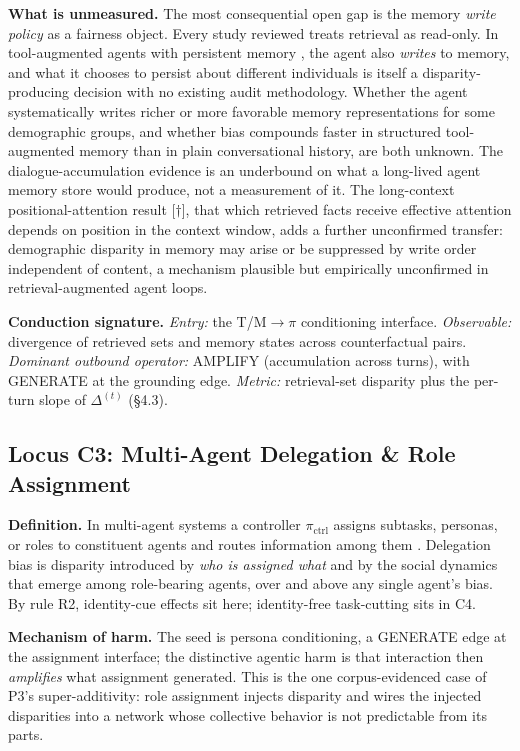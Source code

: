 \documentclass[acmsmall,nonacm]{acmart}
\begin{document}
\textbf{What is unmeasured.} The most consequential open gap is the memory \emph{write policy} as a fairness object. Every study reviewed treats retrieval as read-only. In tool-augmented agents with persistent memory \cite{lewis2020retrieval,packer2023memgpt}, the agent also \emph{writes} to memory, and what it chooses to persist about different individuals is itself a disparity-producing decision with no existing audit methodology. Whether the agent systematically writes richer or more favorable memory representations for some demographic groups, and whether bias compounds faster in structured tool-augmented memory than in plain conversational history, are both unknown. The dialogue-accumulation evidence \cite{fan2024fairmt,simhi2026old} is an underbound on what a long-lived agent memory store would produce, not a measurement of it. The long-context positional-attention result \cite{liu2023lost}[$\dagger$], that which retrieved facts receive effective attention depends on position in the context window, adds a further unconfirmed transfer: demographic disparity in memory may arise or be suppressed by write order independent of content, a mechanism plausible but empirically unconfirmed in retrieval-augmented agent loops.

\textbf{Conduction signature.} \emph{Entry:} the T/M$\rightarrow$$\pi$ conditioning interface. \emph{Observable:} divergence of retrieved sets and memory states across counterfactual pairs. \emph{Dominant outbound operator:} AMPLIFY (accumulation across turns), with GENERATE at the grounding edge. \emph{Metric:} retrieval-set disparity plus the per-turn slope of $\Delta^{(t)}$ (\S{}4.3).

\subsection{Locus C3: Multi-Agent Delegation \& Role Assignment}

\textbf{Definition.} In multi-agent systems a controller $\pi_{\mathrm{ctrl}}$ assigns subtasks, personas, or roles to constituent agents and routes information among them \cite{wu2023autogen,guo2024large,qian2024chatdev}. Delegation bias is disparity introduced by \emph{who is assigned what} and by the social dynamics that emerge among role-bearing agents, over and above any single agent's bias. By rule R2, identity-cue effects sit here; identity-free task-cutting sits in C4.

\textbf{Mechanism of harm.} The seed is persona conditioning, a GENERATE edge at the assignment interface; the distinctive agentic harm is that interaction then \emph{amplifies} what assignment generated. This is the one corpus-evidenced case of P3's super-additivity: role assignment injects disparity and wires the injected disparities into a network whose collective behavior is not predictable from its parts.
\end{document}
